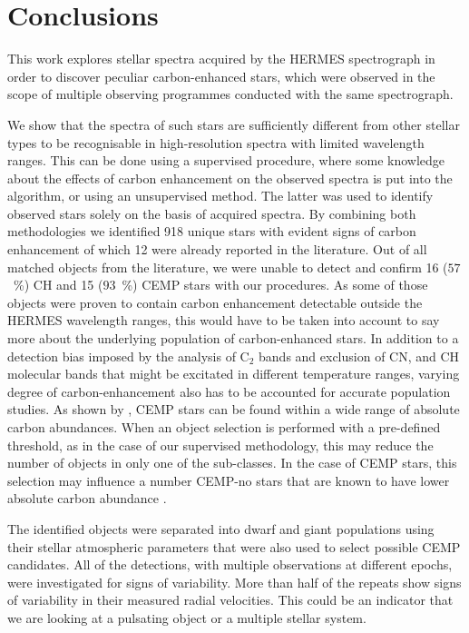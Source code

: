 \section{Conclusions}
\label{sec:summary_cemp}
This work explores stellar spectra acquired by the HERMES spectrograph in order to discover peculiar carbon-enhanced stars, which were observed in the scope of multiple observing programmes conducted with the same spectrograph.

We show that the spectra of such stars are sufficiently different from other stellar types to be recognisable in high-resolution spectra with limited wavelength ranges. This can be done using a supervised procedure, where some knowledge about the effects of carbon enhancement on the observed spectra is put into the algorithm, or using an unsupervised method. The latter was used to identify observed stars solely on the basis of acquired spectra. By combining both methodologies we identified 918 unique stars with evident signs of carbon enhancement of which 12 were already reported in the literature. Out of all matched objects from the literature, we were unable to detect and confirm 16 ($57$~\%) CH and 15 ($93$~\%) CEMP stars with our procedures. As some of those objects were proven to contain carbon enhancement detectable outside the HERMES wavelength ranges, this would have to be taken into account to say more about the underlying population of carbon-enhanced stars. In addition to a detection bias imposed by the analysis of C$_2$ bands and exclusion of CN, and CH molecular bands that might be excitated in different temperature ranges, varying degree of carbon-enhancement also has to be accounted for accurate population studies. As shown by \citet{2016ApJ...833...20Y}, CEMP stars can be found within a wide range of absolute carbon abundances. When an object selection is performed with a pre-defined threshold, as in the case of our supervised methodology, this may reduce the number of objects in only one of the sub-classes. In the case of CEMP stars, this selection may influence a number CEMP-no stars that are known to have lower absolute carbon abundance \citep{2016ApJ...833...20Y}.

The identified objects were separated into dwarf and giant populations using their stellar atmospheric parameters that were also used to select possible CEMP candidates. All of the detections, with multiple observations at different epochs, were investigated for signs of variability. More than half of the repeats show signs of variability in their measured radial velocities. This could be an indicator that we are looking at a pulsating object or a multiple stellar system.

